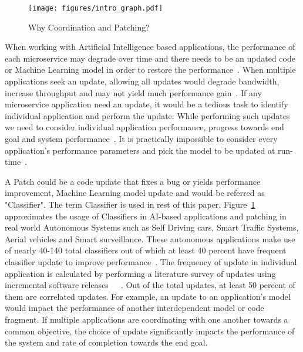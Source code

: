 
\begin{figure}
    \centering
    \texttt{[image: figures/intro\_graph.pdf]}
    \caption{Why Coordination and Patching?}
    \label{fig:introduc}
\end{figure}

When working with Artificial Intelligence based applications, the performance of each microservice may degrade over time and there needs to be an updated code or Machine Learning model in order to restore the performance~\cite{naveeniotonline}. When multiple applications seek an update, allowing all updates would degrade bandwidth, increase throughput and may not yield much performance gain~\cite{naveeniotonline}. If any microservice application need an update, it would be a tedious task to identify individual application and perform the update. While performing such updates we need to consider individual application performance, progress towards end goal and system performance~\cite{7886112}. It is practically impossible to consider every application's performance parameters and pick the model to be updated at run-time~\cite{poster_Aiiot}.

A Patch could be a code update that fixes a bug or yields performance improvement, Machine Learning model update and would be referred as "Classifier". The term Classifier is used in rest of this paper. Figure~\ref{fig:introduc} approximates the usage of Classifiers in AI-based applications and patching in real world Autonomous Systems such as Self Driving cars, Smart Traffic Systems, Aerial vehicles and Smart surveillance. These autonomous applications make use of nearly 40-140 total classifiers out of which at least 40 percent have frequent classifier update to improve performance~\cite{naveeniotonline}. The frequency of update in individual application is calculated by performing a literature survey of updates using incremental software releases~\cite{autopilot}~\cite{dji}~\cite{trlights}.
Out of the total updates, at least 50 percent of them are correlated updates. For example, an update to an application's model would impact the performance of another interdependent model or code fragment. If multiple applications are coordinating with one another towards a common objective, the choice of update significantly impacts the performance of the system and rate of completion towards the end goal.

